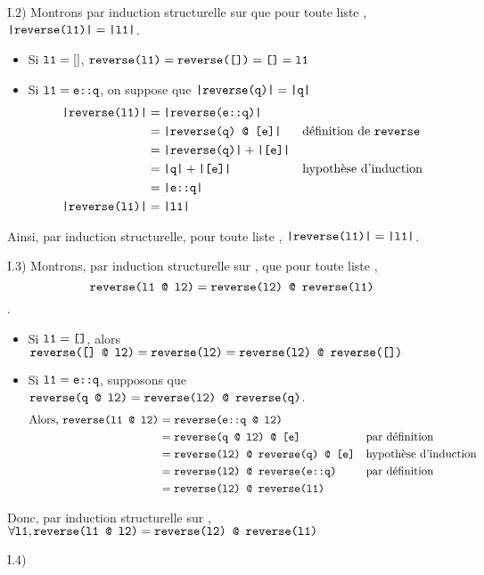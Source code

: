 \begin{question}{I.2) }{}
    Montrons par induction structurelle sur  que pour toute liste , $\texttt{|reverse(l1)|} = \texttt{|l1|}$. \begin{itemize}
        \item Si $\texttt{l1} = []$, $\texttt{reverse(l1)} = \texttt{reverse([])} = \texttt{[]}  = \texttt{l1}$
        \item Si $\texttt{l1} = \texttt{e::q}$, on suppose que $\texttt{|reverse(q)|} = \texttt{|q|}$ \begin{align*}
            \texttt{|reverse(l1)|} &= \texttt{|reverse(e::q)|} &&\\
            &= \texttt{|reverse(q) @ [e]|} && \text{définition de \texttt{reverse}}\\
            &= \texttt{|reverse(q)|} + \texttt{|[e]|} && \\
            &= \texttt{|q|} + \texttt{|[e]|} && \text{hypothèse d'induction}\\
            &= \texttt{|e::q|} && \\
            \texttt{|reverse(l1)|} &= \texttt{|l1|} &&
        \end{align*}
    \end{itemize}
    Ainsi, par induction structurelle, pour toute liste , $\texttt{|reverse(l1)|} = \texttt{|l1|}$.
\end{question}

\begin{question}{I.3) }{}
    Montrons, par induction structurelle sur , que pour toute liste , $$\texttt{reverse(l1 @ l2)} = \texttt{\texttt{reverse(l2)} @ \texttt{reverse(l1)}}$$. \begin{itemize}
        \item Si $\texttt{l1} = \texttt{[]}$, alors $\texttt{reverse([] @ l2)} = \texttt{reverse(l2)} = \texttt{\texttt{reverse(l2)} @ \texttt{reverse([])}}$        
        \item Si $\texttt{l1} = \texttt{e::q}$, supposons que $\texttt{reverse(q @ l2)} = \texttt{\texttt{reverse(l2)} @ \texttt{reverse(q)}}$. \begin{align*}
            \text{Alors, } \texttt{reverse(l1 @ l2)} &= \texttt{reverse(e::q @ l2)} && \\
            &= \texttt{\texttt{reverse(q @ l2)} @ [e]} && \text{par définition} \\
            &= \texttt{\texttt{reverse(l2)} @ \texttt{reverse(q)} @ [e]} && \text{hypothèse d'induction} \\
            &= \texttt{\texttt{reverse(l2)} @ \texttt{reverse(e::q)}} && \text{par définition} \\
            &= \texttt{\texttt{reverse(l2)} @ \texttt{reverse(l1)}}
        \end{align*}
    \end{itemize}
    Donc, par induction structurelle sur , $\forall \texttt{l1}, \texttt{reverse(l1 @ l2)} = \texttt{\texttt{reverse(l2)} @ \texttt{reverse(l1)}}$
\end{question}

\begin{question}{I.4) }{}
    
\end{question}

